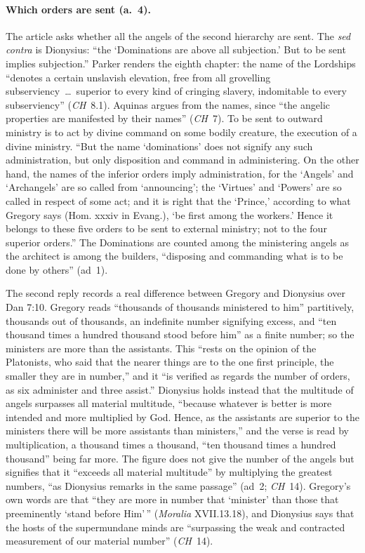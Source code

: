 \paragraph{Which orders are sent (a.~4).} The article asks whether all the
angels of the second hierarchy are sent. The \emph{sed contra} is
Dionysius: ``the `Dominations are above all subjection.' But to be sent
implies subjection.'' Parker renders the eighth chapter: the name of the
Lordships ``denotes a certain unslavish elevation, free from all
grovelling subserviency~\dots\ superior to every kind of cringing slavery,
indomitable to every subserviency'' (\emph{CH}~8.1). Aquinas argues from
the names, since ``the angelic properties are manifested by their names''
(\emph{CH}~7). To be sent to outward ministry is to act by divine command
on some bodily creature, the execution of a divine ministry. ``But the name
`dominations' does not signify any such administration, but only
disposition and command in administering. On the other hand, the names of
the inferior orders imply administration, for the `Angels' and
`Archangels' are so called from `announcing'; the `Virtues' and `Powers' are
so called in respect of some act; and it is right that the `Prince,'
according to what Gregory says (Hom. xxxiv in Evang.), `be first among the
workers.' Hence it belongs to these five orders to be sent to external
ministry; not to the four superior orders.'' The Dominations are counted
among the ministering angels as the architect is among the builders,
``disposing and commanding what is to be done by others'' (ad~1).

The second reply records a real difference between Gregory and Dionysius
over Dan 7:10. Gregory reads ``thousands of thousands ministered to him''
partitively, thousands out of thousands, an indefinite number signifying
excess, and ``ten thousand times a hundred thousand stood before him'' as a
finite number; so the ministers are more than the assistants. This
``rests on the opinion of the Platonists, who said that the nearer things
are to the one first principle, the smaller they are in number,'' and it
``is verified as regards the number of orders, as six administer and three
assist.'' Dionysius holds instead that the multitude of angels surpasses
all material multitude, ``because whatever is better is more intended and
more multiplied by God. Hence, as the assistants are superior to the
ministers there will be more assistants than ministers,'' and the verse is
read by multiplication, a thousand times a thousand, ``ten thousand times a
hundred thousand'' being far more. The figure does not give the number of
the angels but signifies that it ``exceeds all material multitude'' by
multiplying the greatest numbers, ``as Dionysius remarks in the same
passage'' (ad~2; \emph{CH}~14). Gregory's own words are that
``they are more in number that `minister' than those that preeminently
`stand before Him'\,'' (\emph{Moralia} XVII.13.18), and Dionysius says that
the hosts of the supermundane minds are ``surpassing the weak and
contracted measurement of our material number'' (\emph{CH}~14).

